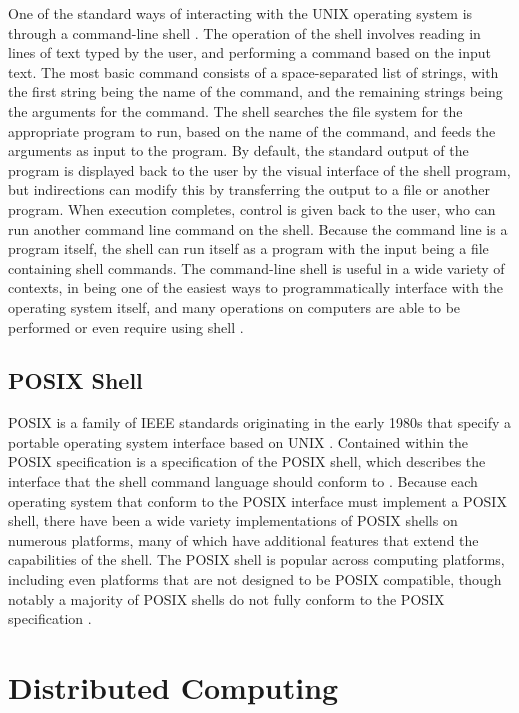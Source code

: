 \documentclass[twoside]{report}
\begin{document}
One of the standard ways of interacting with the UNIX operating system is through a command-line shell \cite{10.1145/361011.361061}.
The operation of the shell involves reading in lines of text typed by the user, and performing a command based on the input text.
The most basic command consists of a space-separated list of strings, with the first string being the name of the command, and the remaining strings being the arguments for the command.
The shell searches the file system for the appropriate program to run, based on the name of the command, and feeds the arguments as input to the program.
By default, the standard output of the program is displayed back to the user by the visual interface of the shell program, but indirections can modify this by transferring the output to a file or another program.
When execution completes, control is given back to the user, who can run another command line command on the shell.
Because the command line is a program itself, the shell can run itself as a program with the input being a file containing shell commands.
The command-line shell is useful in a wide variety of contexts, in being one of the easiest ways to programmatically interface with the operating system itself, and many operations on computers are able to be performed or even require using shell \cite{10.1145/3371111}.

\subsection{POSIX Shell}
POSIX is a family of IEEE standards originating in the early 1980s that specify a portable operating system interface based on UNIX \cite{10.1145/210308.210315}.
Contained within the POSIX specification is a specification of the POSIX shell, which describes the interface that the shell command language should conform to \cite{posix2017}.
Because each operating system that conform to the POSIX interface must implement a POSIX shell, there have been a wide variety implementations of POSIX shells on numerous platforms, many of which have additional features that extend the capabilities of the shell.
The POSIX shell is popular across computing platforms, including even platforms that are not designed to be POSIX compatible, though notably a majority of POSIX shells do not fully conform to the POSIX specification \cite{10.1145/3371111}.

\section{Distributed Computing}
\end{document}
